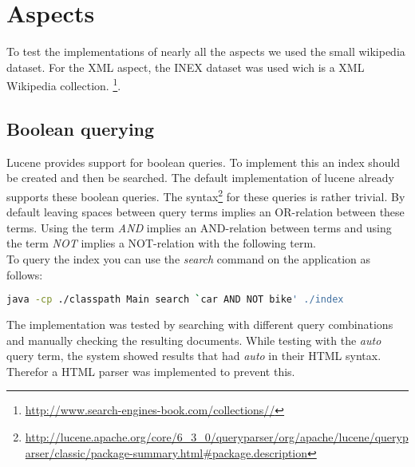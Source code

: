 \documentclass{article}
\begin{document}
\section{Aspects}
To test the implementations of nearly all the aspects we used the small wikipedia dataset. For the XML aspect, the INEX dataset was used wich is a XML Wikipedia collection.
\footnote{\url{http://www.search-engines-book.com/collections//}}.
\subsection{Boolean querying}
Lucene provides support for boolean queries. To implement this an index should be created and then be searched. The default implementation of lucene already supports these boolean queries. The syntax\footnote{\url{http://lucene.apache.org/core/6_3_0/queryparser/org/apache/lucene/queryparser/classic/package-summary.html#package.description}} for these queries is rather trivial. By default leaving spaces between query terms implies an OR-relation between these terms. Using the term \emph{AND} implies an AND-relation between terms and using the term \emph{NOT} implies a NOT-relation with the following term.\\
To query the index you can use the \emph{search} command on the application as follows:
\begin{lstlisting}[language=Bash, label={lst:search}]
java -cp ./classpath Main search `car AND NOT bike' ./index
\end{lstlisting}
The implementation was tested by searching with different query combinations and manually checking the resulting documents. While testing with the \emph{auto} query term, the system showed results that had \emph{auto} in their HTML syntax. Therefor a HTML parser was implemented to prevent this.
\end{document}
